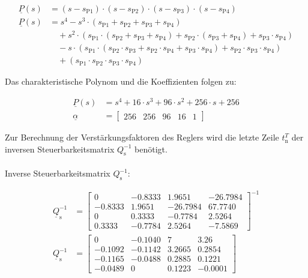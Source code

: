 \begin{align*}
    \underline{P}(s) &= (s-s_{\mathrm{P1}})\cdot(s-s_{\mathrm{P2}})\cdot(s-s_{\mathrm{P3}})\cdot(s-s_{\mathrm{P4}}) \\
    \underline{P}(s) &= s^4-s^3\cdot(s_{\mathrm{P1}}+s_{\mathrm{P2}}+s_{\mathrm{P3}}+s_{\mathrm{P4}}) \nonumber \\ 
    &\quad +s^2\cdot(s_{\mathrm{P1}}\cdot(s_{\mathrm{P2}}+s_{\mathrm{P3}}+s_{\mathrm{P4}})+s_{\mathrm{P2}}\cdot(s_{\mathrm{P3}}+s_{\mathrm{P4}})+s_{\mathrm{P3}}\cdot s_{\mathrm{P4}}) \nonumber \\
    &\quad -s\cdot(s_{\mathrm{P1}}\cdot(s_{\mathrm{P2}}\cdot s_{\mathrm{P3}}+s_{\mathrm{P2}}\cdot s_{\mathrm{P4}}+s_{\mathrm{P3}}\cdot s_{\mathrm{P4}})+s_{\mathrm{P2}}\cdot s_{\mathrm{P3}}\cdot s_{\mathrm{P4}}) \nonumber \\
    &\quad +(s_{\mathrm{P1}}\cdot s_{\mathrm{P2}}\cdot s_{\mathrm{P3}}\cdot s_{\mathrm{P4}})
\end{align*}

Das charakteristische Polynom und die Koeffizienten folgen zu:

\begin{align}
    \underline{P}(s) &= s^4+16\cdot s^3+96\cdot s^2+256\cdot s+256 \nonumber \\
    \underline{\alpha} &=
    \begin{bmatrix}
        256 & 256 & 96 & 16 & 1
    \end{bmatrix} \label{eq:Gleichung38}
\end{align}

Zur Berechnung der Verstärkungsfaktoren des Reglers wird die letzte Zeile $t_{\mathrm{n}}^T$ der inversen Steuerbarkeitsmatrix $Q_{\mathrm{s}}^{-1}$ benötigt.\\\\
Inverse Steuerbarkeitsmatrix $Q_{\mathrm{s}}^{-1}$:

\begin{align*}
    \underline{Q}_{\mathrm{s}}^{-1} &=
    \begin{bmatrix}
         0 & -0.8333 & 1.9651 & -26.7984 \\
        -0.8333 & 1.9651 & -26.7984 & 67.7740 \\
        0 & 0.3333 & -0.7784 & 2.5264 \\
        0.3333 & -0.7784 & 2.5264 & -7.5869
    \end{bmatrix}^{-1} \\
    \underline{Q}_{\mathrm{s}}^{-1} &=
    \begin{bmatrix}
        0 & -0.1040 & 7 & 3.26 \\
        -0.1092 & -0.1142 & 3.2665 & 0.2854 \\
        -0.1165 & -0.0488 & 0.2885 & 0.1221 \\
        -0.0489 & 0 & 0.1223 & -0.0001
    \end{bmatrix}
\end{align*}


